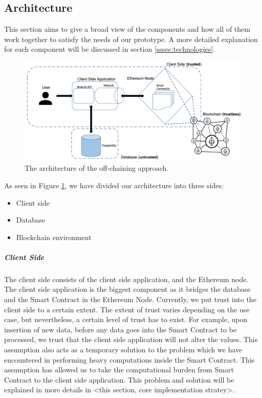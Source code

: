 \subsection{Architecture}

This section aims to give a broad view of the components and how all of them work together to satisfy the needs of our prototype. A more detailed explanation for each component will be discussed in section \ref{sssec:technologies}.

\begin{figure}[t]%
\centering
\includegraphics[width=1.0\textwidth]{images/architecture.png}
\caption{\label{fig:architecture}The architecture of the off-chaining approach.}
\end{figure}

As seen in Figure \ref{fig:architecture}, we have divided our architecture into three sides:
\begin{itemize}
\item Client side
\item Database
\item Blockchain environment
\end{itemize}

\subparagraph{Client Side}
The client side consists of the client side application, and the Ethereum node. The client side application is the biggest component as it bridges the database and the Smart Contract in the Ethereum Node. Currently, we put trust into the client side to a certain extent. The extent of trust varies depending on the use case, but nevertheless, a certain level of trust has to exist. For example, upon insertion of new data, before any data goes into the Smart Contract to be processed, we trust that the client side application will not alter the values. This assumption also acts as a temporary solution to the problem which we have encountered in performing heavy computations inside the Smart Contract. This assumption has allowed us to take the computational burden from Smart Contract to the client side application. This problem and solution will be explained in more details in <this section, core implementation stratey>.


